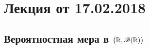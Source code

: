 \section{Лекция от 17.02.2018}
\subsection{Вероятностная мера в $\big( \mathbb{R}, \mathscr{B}(\mathbb{R}) \big)$}
\begin{definition}
	
\end{definition}